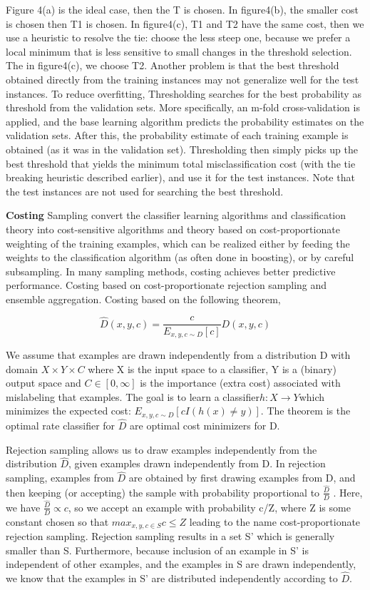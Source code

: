 Figure 4(a) is the ideal case, then the T is chosen. In figure4(b), the smaller cost is chosen then T1 is chosen. In figure4(c), T1 and T2 have the same cost, then we use a heuristic to resolve the tie: choose the less steep one, because we prefer a local minimum that is less sensitive to small changes in the threshold selection. The in figure4(c), we choose T2.
Another problem is that the best threshold obtained directly from the training instances may not generalize well for the test instances. To reduce overfitting, Thresholding searches for the best probability as threshold from the validation sets. More specifically, an m-fold cross-validation is applied, and the base learning algorithm predicts the probability estimates on the validation sets. After this, the probability estimate of each training example is obtained (as it was in the validation set). Thresholding then simply picks up the best threshold that yields the minimum total misclassification cost (with the tie breaking heuristic described earlier), and use it for the test instances. Note that the test instances are not used for searching the best threshold.

\textbf{Costing}
Sampling convert the classifier learning algorithms and classification theory into cost-sensitive algorithms and theory based on cost-proportionate weighting of the training examples, which can be realized either by feeding the weights to the classification algorithm (as often done in boosting), or by careful subsampling. In many sampling methods, costing achieves better predictive performance.
Costing \cite{ref_D} based on cost-proportionate rejection sampling and ensemble aggregation. Costing based on the following theorem,

\begin{equation}
    \hat{D}(x,y,c)=\frac{c}{E_{x,y,c \sim D}[c]}D(x,y,c)
\end{equation}

We assume that examples are drawn independently from a distribution D with domain $X \times Y \times C$ where X is the input space to a classifier, Y is a (binary) output space and $C\in [0,\infty]$ is the importance (extra cost) associated with mislabeling that examples.  The goal is to learn a classifier$ h : X \to Y $which minimizes the expected cost: $E_{x,y,c \sim D} [c I(h(x) \ne y)]$. The theorem is the optimal rate classifier for $\hat{D}$ are optimal cost minimizers for D.

Rejection sampling allows us to draw examples independently from the distribution $\hat{D}$, given examples drawn independently from D.  In rejection sampling, examples from $\hat{D}$ are obtained by first drawing examples from D, and then keeping (or accepting) the sample with probability proportional to $\frac{\hat{D}}{D}$  . Here, we have $\frac{\hat{D}}{D} \propto c$, so we accept an example with probability c/Z, where Z is some constant chosen so that $max_{x,y,c \in S } c \le Z$ leading to the name cost-proportionate rejection sampling. Rejection sampling results in a set S’ which is generally smaller than S. Furthermore, because inclusion of an example in S’ is independent
of other examples, and the examples in S are drawn independently, we know that the examples in S’ are distributed independently according to $\hat{D}$.

